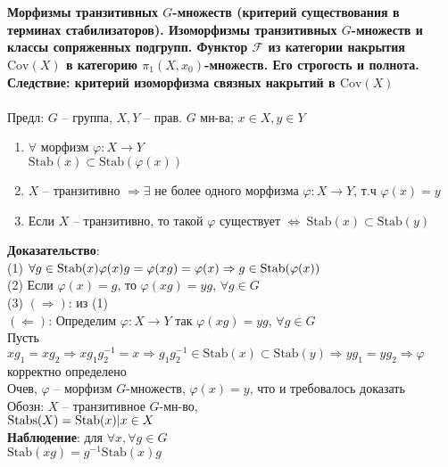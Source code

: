 \section{}
	\textbf{Морфизмы транзитивных $G$-множеств (критерий существования в терминах стабилизаторов). Изоморфизмы транзитивных $G$-множеств и классы сопряженных подгрупп. Функтор $\mathcal{F}$ из категории накрытия $\text{Cov}(X)$ в категорию ${\pi}_1 (X, x_0)$-множеств. Его строгость и полнота. Следствие: критерий изоморфизма связных накрытий в $\text{Cov}(X)$}\\
	\\
	Предл: $G$ -- группа, $X, Y$ -- прав. $G$ мн-ва; $x \in X, y \in Y$\\
	\begin{enumerate}
	\item $\forall$ морфизм $\varphi: X \rightarrow Y$\\
		$\text{Stab}(x) \subset \text{Stab}(\varphi(x))$
	\item $X$ -- транзитивно $\Rightarrow \exists$ не более одного морфизма $\varphi: X \rightarrow Y$, т.ч $\varphi(x) = y$
	\item Если $X$ -- транзитивно, то такой $\varphi$ существует $\Leftrightarrow\ \text{Stab}(x) \subset \text{Stab}(y)$
	\end{enumerate}
	\textbf{Доказательство}:\\ 
	(1) $\forall g \in \text{Stab}(x)\\
	\varphi(x)g = \varphi(xg) = \varphi(x) \Rightarrow g \in \text{Stab}(\varphi(x))$\\
	(2) Если $\varphi(x) = g$, то $\varphi(xg) = yg$, $\forall g \in G$\\
	(3) $(\Rightarrow)$: из (1)\\
	$(\Leftarrow)$: Определим $\varphi: X \rightarrow Y$ так $\varphi(xg) = yg$, $\forall g \in G$\\
	Пусть $xg_1 = xg_2 \Rightarrow xg_1g_2^{-1} = x \Rightarrow g_1g_2^{-1} \in \text{Stab}(x) \subset \text{Stab}(y) \Rightarrow yg_1 = yg_2 \Rightarrow \varphi$ корректно определено\\
	Очев, $\varphi$ -- морфизм $G$-множеств, $\varphi(x) = y$, что и требовалось доказать\\
	Обозн: $X$ -- транзитивное $G$-мн-во,\\
	$\text{\text{Stabs}}(X) = \text{Stab}(x)|x \in X$\\
	\textbf{Наблюдение}: для $\forall x, \forall g \in G$\\
	$\text{Stab}(xg) = g^{-1}\text{Stab}(x)g$\\
